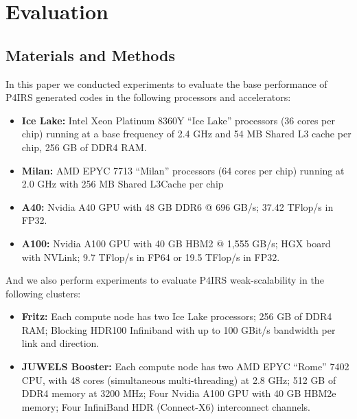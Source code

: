 \documentclass[preprint,12pt]{elsarticle}
\begin{document}
\section{Evaluation}
\label{sec:evaluation}


\subsection{Materials and Methods}

In this paper we conducted experiments to evaluate the base performance of P4IRS generated codes in the following processors and accelerators:

\begin{itemize}
  \item \textbf{Ice Lake:} Intel Xeon Platinum 8360Y “Ice Lake” processors (36 cores per chip) running at a base frequency of 2.4 GHz and 54 MB Shared L3 cache per chip, 256 GB of DDR4 RAM.
  \item \textbf{Milan:} AMD EPYC 7713 “Milan” processors (64 cores per chip) running at 2.0 GHz with 256 MB Shared L3Cache per chip
  \item \textbf{A40:} Nvidia A40 GPU with 48 GB DDR6 @ 696 GB/s; 37.42 TFlop/s in FP32.
  \item \textbf{A100:} Nvidia A100 GPU with 40 GB HBM2 @ 1,555 GB/s; HGX board with NVLink; 9.7 TFlop/s in FP64 or 19.5 TFlop/s in FP32.
\end{itemize}

And we also perform experiments to evaluate P4IRS weak-scalability in the following clusters:

\begin{itemize}
  \item \textbf{Fritz:} Each compute node has two Ice Lake processors; 256 GB of DDR4 RAM; Blocking HDR100 Infiniband with up to 100 GBit/s bandwidth per link and direction.
  \item \textbf{JUWELS Booster:} Each compute node has two AMD EPYC ``Rome'' 7402 CPU, with 48 cores (simultaneous multi-threading) at 2.8 GHz; 512 GB of DDR4 memory at 3200 MHz; Four Nvidia A100 GPU with 40 GB HBM2e memory; Four InfiniBand HDR (Connect-X6) interconnect channels.
\end{itemize}
\end{document}
